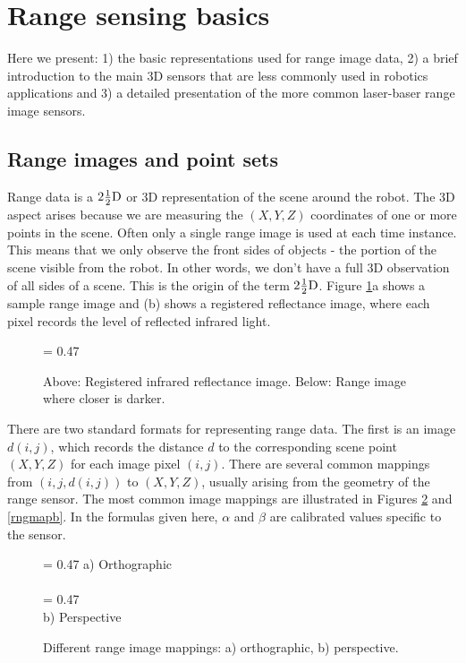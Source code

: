 \documentclass[twocolumn,oneside]{book}
\begin{document}
\section{Range sensing basics \label{sec22.1}}

Here we present: 1) the basic representations used for range image data,
2) a brief introduction to the main 3D sensors that are less commonly used
in robotics applications and 3) a detailed presentation of the more common 
laser-baser range image sensors.

\subsection{Range images and point sets} \label{sec22.1.1}

 Range data is a $2\frac{1}{2}{\rm D}$ or 3D representation of the scene
around the robot.
The 3D aspect arises because we are measuring the $(X,Y,Z)$ coordinates
of one or more points in the scene.
Often only a single  range image is used at each time instance.
This means that we only observe the front sides of objects - the
portion of the scene visible from the robot.
In other words, we don't have a full 3D observation of all sides of
a scene.
This is the origin of the term $2\frac{1}{2}{\rm D}$.
Figure \ref{fig23.1}a shows a sample range image and (b) shows a 
 registered reflectance image, where each pixel records the level of reflected 
infrared light.
\begin{figure}
{\epsfxsize = 0.47\textwidth {}}
\caption{
Above: Registered infrared reflectance image.
Below: Range image where closer is darker.
\label{fig23.1}}
\end{figure}

There are two standard formats for representing range data.
The first is an image $d(i,j)$, which records the distance $d$ to the
corresponding scene point $(X,Y,Z)$ for each image pixel $(i,j)$.
There are several common mappings from $(i,j,d(i,j))$ to $(X,Y,Z)$,
usually arising from the geometry of the range sensor.
The most common image mappings are illustrated in Figures \ref{rngmapa} and
\ref{rngmapb}.
In the formulas given here,
$\alpha$ and $\beta$ are calibrated values specific to the sensor.
\begin{figure}[htb]
{\epsfxsize = 0.47\textwidth {}}
a) Orthographic\\
\ \\
{\epsfxsize = 0.47\textwidth {}}\\
b) Perspective
\caption{Different range image mappings: a) orthographic, b) perspective.
\label{rngmapa}}
\end{figure}
\end{document}
